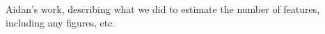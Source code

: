 
Aidan's work, describing what we did to estimate the number of features, including any figures, etc. 